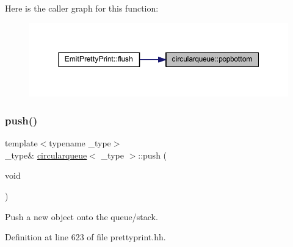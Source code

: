 Here is the caller graph for this function\+:
\nopagebreak
\begin{figure}[H]
\begin{center}
\leavevmode
\includegraphics[width=350pt]{classcircularqueue_a5d1e7b79b064d02539960ea2a3e0d8cf_icgraph}
\end{center}
\end{figure}
\mbox{\label{classcircularqueue_a06f099e37388f3eccd8962f4d7199e17}} 
\subsubsection{\texorpdfstring{push()}{push()}}
{\footnotesize\ttfamily template$<$typename \+\_\+type$>$ \\
\+\_\+type\& \mbox{\hyperlink{classcircularqueue}{circularqueue}}$<$ \+\_\+type $>$\+::push (\begin{DoxyParamCaption}\item[{void}]{ }\end{DoxyParamCaption})\hspace{0.3cm}{\ttfamily [inline]}}



Push a new object onto the queue/stack. 



Definition at line 623 of file prettyprint.\+hh.

